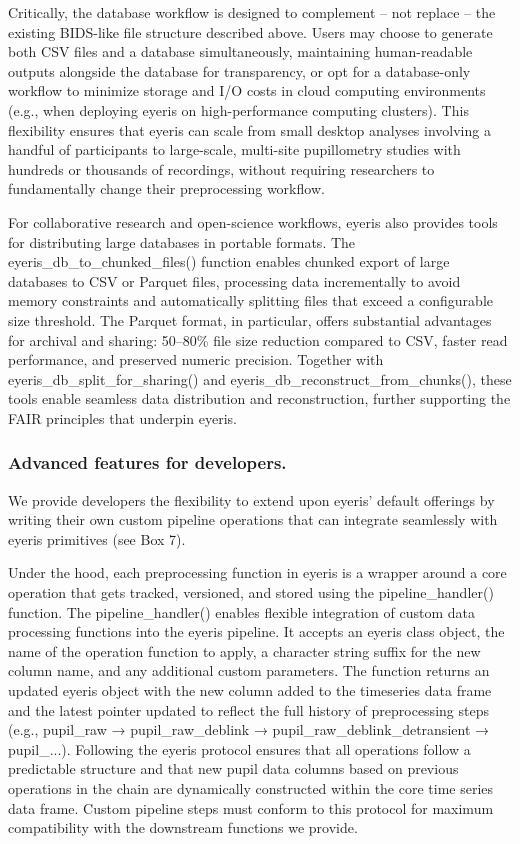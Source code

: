 Critically, the database workflow is designed to complement – not replace – the existing BIDS-like file structure described above. Users may choose to generate both CSV files and a database simultaneously, maintaining human-readable outputs alongside the database for transparency, or opt for a database-only workflow to minimize storage and I/O costs in cloud computing environments (e.g., when deploying eyeris on high-performance computing clusters). This flexibility ensures that eyeris can scale from small desktop analyses involving a handful of participants to large-scale, multi-site pupillometry studies with hundreds or thousands of recordings, without requiring researchers to fundamentally change their preprocessing workflow.

For collaborative research and open-science workflows, eyeris also provides tools for distributing large databases in portable formats. The eyeris\_db\_to\_chunked\_files() function enables chunked export of large databases to CSV or Parquet files, processing data incrementally to avoid memory constraints and automatically splitting files that exceed a configurable size threshold. The Parquet format, in particular, offers substantial advantages for archival and sharing: 50–80\% file size reduction compared to CSV, faster read performance, and preserved numeric precision. Together with eyeris\_db\_split\_for\_sharing() and eyeris\_db\_reconstruct\_from\_chunks(), these tools enable seamless data distribution and reconstruction, further supporting the FAIR principles that underpin eyeris.

\subsubsection{Advanced features for developers.}
We provide developers the flexibility to extend upon eyeris’ default offerings by writing their own custom pipeline operations that can integrate seamlessly with eyeris primitives (see Box 7).

Under the hood, each preprocessing function in eyeris is a wrapper around a core operation that gets tracked, versioned, and stored using the pipeline\_handler() function. The pipeline\_handler() enables flexible integration of custom data processing functions into the eyeris pipeline. It accepts an eyeris class object, the name of the operation function to apply, a character string suffix for the new column name, and any additional custom parameters. The function returns an updated eyeris object with the new column added to the timeseries data frame and the latest pointer updated to reflect the full history of preprocessing steps (e.g., pupil\_raw → pupil\_raw\_deblink → pupil\_raw\_deblink\_detransient → pupil\_...). Following the eyeris protocol ensures that all operations follow a predictable structure and that new pupil data columns based on previous operations in the chain are dynamically constructed within the core time series data frame. Custom pipeline steps must conform to this protocol for maximum compatibility with the downstream functions we provide.

